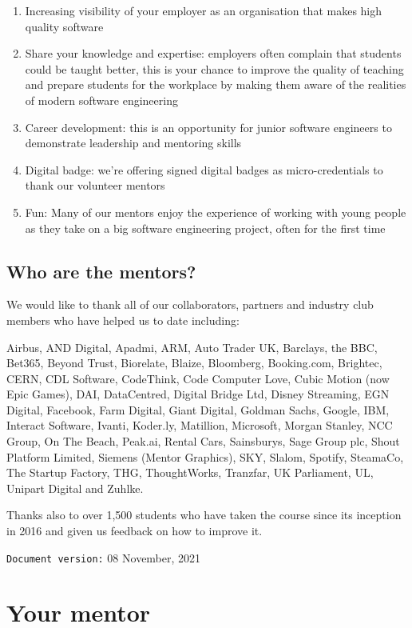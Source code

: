 \documentclass[
]{book}
\providecommand{\tightlist}{%
  \setlength{\itemsep}{0pt}\setlength{\parskip}{0pt}}
\begin{document}
\begin{enumerate}
\def\labelenumi{\arabic{enumi}.}
\tightlist
\item
  Increasing visibility of your employer as an organisation that makes high quality software
\item
  Share your knowledge and expertise: employers often complain that students could be taught better, this is your chance to improve the quality of teaching and prepare students for the workplace by making them aware of the realities of modern software engineering
\item
  Career development: this is an opportunity for junior software engineers to demonstrate leadership and mentoring skills
\item
  Digital badge: we're offering signed digital badges as micro-credentials to thank our volunteer mentors
\item
  Fun: Many of our mentors enjoy the experience of working with young people as they take on a big software engineering project, often for the first time
\end{enumerate}

\hypertarget{thanks}{%
\section{Who are the mentors?}\label{thanks}}

We would like to thank all of our collaborators, partners and industry club members who have helped us to date including:

Airbus, AND Digital, Apadmi, ARM, Auto Trader UK, Barclays, the BBC, Bet365, Beyond Trust, Biorelate, Blaize, Bloomberg, Booking.com, Brightec, CERN, CDL Software, CodeThink, Code Computer Love, Cubic Motion (now Epic Games), DAI, DataCentred, Digital Bridge Ltd, Disney Streaming, EGN Digital, Facebook, Farm Digital, Giant Digital, Goldman Sachs, Google, IBM, Interact Software, Ivanti, Koder.ly, Matillion, Microsoft, Morgan Stanley, NCC Group, On The Beach, Peak.ai, Rental Cars, Sainsburys, Sage Group plc, Shout Platform Limited, Siemens (Mentor Graphics), SKY, Slalom, Spotify, SteamaCo, The Startup Factory, THG, ThoughtWorks, Tranzfar, UK Parliament, UL, Unipart Digital and Zuhlke.

Thanks also to over 1,500 students who have taken the course since its inception in 2016 and given us feedback on how to improve it.

\texttt{Document\ version:} 08 November, 2021

\hypertarget{ourmentor}{%
\chapter{Your mentor}\label{ourmentor}}
\end{document}
